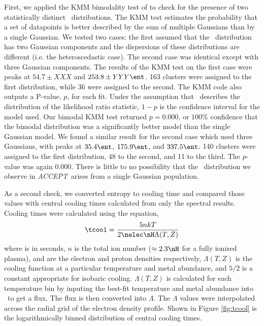 \documentclass[12pt, preprint]{aastex}
\newcommand{\accept}{\textit{ACCEPT}}
\begin{document}
{{First, we applied the KMM bimodality test of \cite{1994AJ....108.2348A}
to check for the presence of two statistically distinct \kna\
distributions. The KMM test estimates the probability that a set of
datapoints is better described by the sum of multiple Gaussians than
by a single Gaussian. We tested two cases: the first assumed that the
\kna\ distribution has two Gaussian components and the dispersions of
these distributions are different (i.e. the heteroscedastic case). The
second case was identical except with three Gaussian components. The
results of the KMM test on the first case were peaks at $54.7 \pm XXX$
and $253.8 \pm YYY \ent$. 163 clusters were assigned to the first
distribution, while 36 were assigned to the second. The KMM code also
outputs a P-value, $p$, for each fit. Under the assumption that
\chisq\ describes the distribution of the likelihood ratio statistic,
$1-p$ is the confidence interval for the model used. Our bimodal KMM
test returned $p = 0.000$, or $100\%$ confidence that the bimodal
distribution was a significantly better model than the single Gaussian
model. We found a similar result for the second case which used three
Gaussians, with peaks at $35.4 \ent$, $175.9 \ent$, and $337.5
\ent$. 140 clusters were assigned to the first distribution, 48 to the
second, and 11 to the third. The $p$-value was again 0.000. There is
little to no possibility that the \kna\ distribution we observe in
\accept\ arises from a single Gaussian population.

As a second check, we converted entropy to cooling time and compared
those values with central cooling times calculated from only the
spectral results. Cooling times were calculated using the equation,
\begin{equation}
\tcool = \frac{5nkT}{2\nelec \nH\Lambda(T,Z)}
\label{eqn:tcool}
\end{equation}
where \tcool is in seconds, $n$ is the total ion number ($\approx
2.3\nH$ for a fully ionized plasma), \nelec and \nH are the electron
and proton densities respectively, $\Lambda(T,Z)$ is the cooling
function at a particular temperature and metal abundance, and $5/2$ is
a constant appropriate for isobaric cooling. $\Lambda(T,Z)$ is
calculated for each temperature bin by inputing the best-fit
temperature and metal abundance into \xspec\ to get a flux. The
flux is then converted into $\Lambda$. The $\Lambda$ values were
interpolated across the radial grid of the electron density
profile. Shown in Figure \ref{fig:tcool} is the logarithmically binned
distribution of central cooling times.

}}
\end{document}
